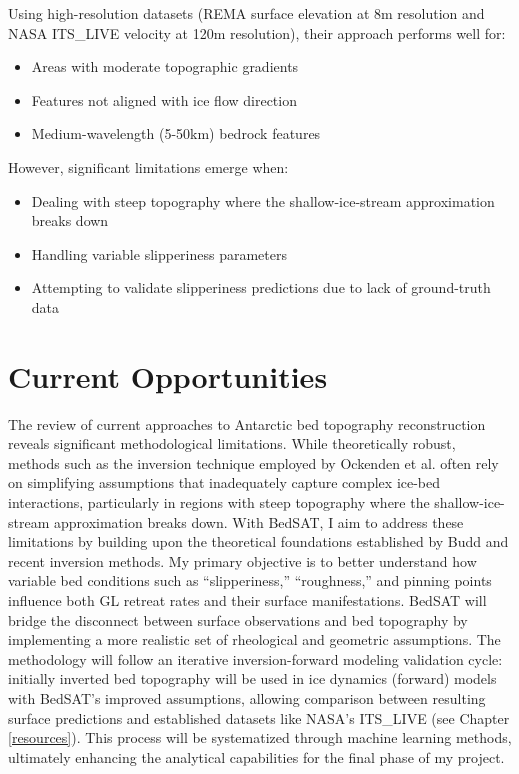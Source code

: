Using high-resolution datasets (REMA surface elevation at 8m resolution and NASA ITS\_LIVE velocity at 120m resolution), their approach performs well for:
\begin{itemize}
    \item Areas with moderate topographic gradients
    \item Features not aligned with ice flow direction
    \item Medium-wavelength (5-50km) bedrock features
\end{itemize}

However, significant limitations emerge when:
\begin{itemize}
    \item Dealing with steep topography where the shallow-ice-stream approximation breaks down
    \item Handling variable slipperiness parameters
    \item Attempting to validate slipperiness predictions due to lack of ground-truth data
\end{itemize}


\section{Current Opportunities}

The review of current approaches to Antarctic bed topography reconstruction reveals significant methodological limitations. While theoretically robust, methods such as the inversion technique employed by Ockenden et al. often rely on simplifying assumptions that inadequately capture complex ice-bed interactions, particularly in regions with steep topography where the shallow-ice-stream approximation breaks down.
With BedSAT, I aim to address these limitations by building upon the theoretical foundations established by Budd and recent inversion methods. My primary objective is to better understand how variable bed conditions such as ``slipperiness,'' ``roughness,'' and pinning points influence both GL retreat rates and their surface manifestations. BedSAT will bridge the disconnect between surface observations and bed topography by implementing a more realistic set of rheological and geometric assumptions. The methodology will follow an iterative inversion-forward modeling validation cycle: initially inverted bed topography will be used in ice dynamics (forward) models with BedSAT's improved assumptions, allowing comparison between resulting surface predictions and established datasets like NASA's ITS\_LIVE (see Chapter \ref{resources}). This process will be systematized through machine learning methods, ultimately enhancing the analytical capabilities for the final phase of my project.
